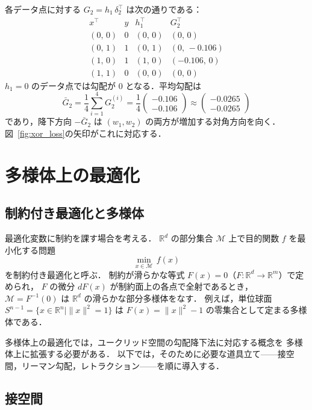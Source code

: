 \documentclass[uplatex, dvipdfmx]{jsarticle}
\begin{document}
各データ点に対する $G_2 = h_1\,\delta_2^\top$ は次の通りである：
\[
\begin{array}{c|c|c|c}
x^\top & y & h_1^\top & G_2^\top \\ \hline
(0,\,0) & 0 & (0,\,0) & (0,\,0) \\
(0,\,1) & 1 & (0,\,1) & (0,\,-0.106) \\
(1,\,0) & 1 & (1,\,0) & (-0.106,\,0) \\
(1,\,1) & 0 & (0,\,0) & (0,\,0)
\end{array}
\]
$h_1=0$ のデータ点では勾配が $0$ となる．平均勾配は
\[
\bar{G}_2
= \frac{1}{4}\sum_{i=1}^{4} G_2^{(i)}
= \frac{1}{4}\begin{pmatrix}-0.106\\-0.106\end{pmatrix}
\approx \begin{pmatrix}-0.0265\\-0.0265\end{pmatrix}
\]
であり，降下方向 $-\bar{G}_2$ は $(w_1,w_2)$ の両方が増加する対角方向を向く．
図~\ref{fig:xor_loss}の矢印がこれに対応する．

\section{多様体上の最適化}

\subsection{制約付き最適化と多様体}

最適化変数に制約を課す場合を考える．
$\mathbb{R}^d$ の部分集合 $\mathcal{M}$ 上で目的関数 $f$ を最小化する問題
\[
\min_{x \in \mathcal{M}}\, f(x)
\]
を制約付き最適化と呼ぶ．
制約が滑らかな等式 $F(x) = 0$（$F\colon \mathbb{R}^d \to \mathbb{R}^m$）で定められ，
$F$ の微分 $dF(x)$ が制約面上の各点で全射であるとき，
$\mathcal{M} = F^{-1}(0)$ は $\mathbb{R}^d$ の滑らかな部分多様体をなす．
例えば，単位球面 $S^{n-1} = \{x \in \mathbb{R}^n \mid \|x\|^2 = 1\}$ は
$F(x) = \|x\|^2 - 1$ の零集合として定まる多様体である．

多様体上の最適化では，ユークリッド空間の勾配降下法に対応する概念を
多様体上に拡張する必要がある．
以下では，そのために必要な道具立て——接空間，リーマン勾配，レトラクション——を順に導入する．

\subsection{接空間}
\end{document}
